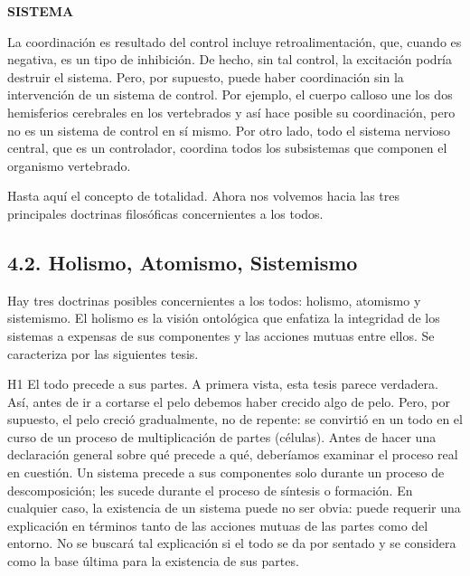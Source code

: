 \newpage
\fancyhf{}
\fancyhead[r]{\thepage}
\begin{center}
{\fontsize{13}{16}\selectfont \textbf{SISTEMA}}
\end{center}
\vspace{0.5cm}

{\fontsize{13}{15}\selectfont
La coordinación es resultado del control incluye retroalimentación, que, cuando es negativa, es un tipo de inhibición. De hecho, sin tal control, la excitación podría destruir el sistema. 
Pero, por supuesto, puede haber coordinación sin la intervención de un sistema de control. Por ejemplo, el cuerpo calloso une los dos hemisferios cerebrales en los vertebrados y así hace posible su coordinación, pero no es un sistema de control en sí mismo. 
Por otro lado, todo el sistema nervioso central, que es un controlador, coordina todos los subsistemas que componen el organismo vertebrado.

Hasta aquí el concepto de totalidad. Ahora nos volvemos hacia las tres principales doctrinas filosóficas concernientes a los todos.

\subsection* {4.2. Holismo, Atomismo, Sistemismo}

Hay tres doctrinas posibles concernientes a los todos: holismo, atomismo y sistemismo. El holismo es la visión ontológica que enfatiza la integridad de los sistemas a expensas de sus componentes y las acciones mutuas entre ellos. 
Se caracteriza por las siguientes tesis.

H1 El todo precede a sus partes. A primera vista, esta tesis parece verdadera. Así, antes de ir a cortarse el pelo debemos haber crecido algo de pelo. 
Pero, por supuesto, el pelo creció gradualmente, no de repente: se convirtió en un todo en el curso de un proceso de multiplicación de partes (células). Antes de hacer una declaración general sobre qué precede a qué, deberíamos examinar el proceso real en cuestión. 
Un sistema precede a sus componentes solo durante un proceso de descomposición; les sucede durante el proceso de síntesis o formación. En cualquier caso, la existencia de un sistema puede no ser obvia: puede requerir una explicación en términos tanto de las acciones mutuas de las partes como del entorno. No se buscará tal explicación si el todo se da por sentado y se considera como la base última para la existencia de sus partes.

}
